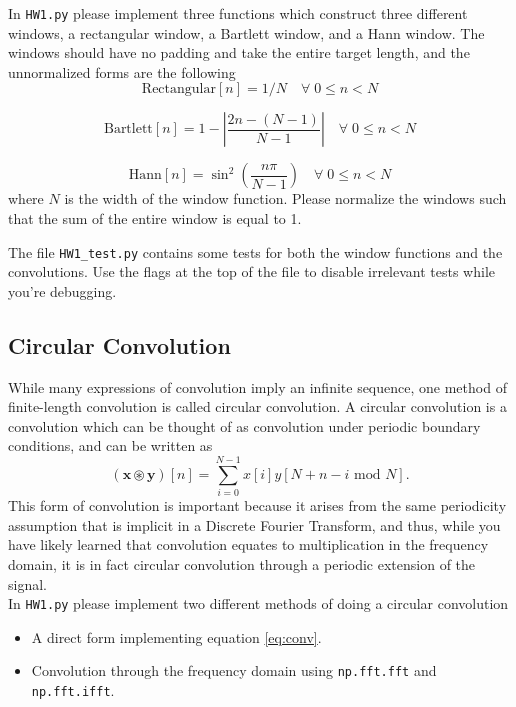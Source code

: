 \documentclass[12pt]{article}
\newcommand{\x}{\mathbf{x}}
\newcommand{\y}{\mathbf{y}}
\newcommand{\0}{\mathbf{0}}
\begin{document}
In \verb|HW1.py| please implement three functions which construct three different windows, a rectangular window, a Bartlett window, and a Hann window.
The windows should have no padding and take the entire target length, and the unnormalized forms are the following
\begin{equation}
\text{Rectangular}[n] = 1/N \quad \forall \; 0 \leq n < N
\end{equation}

\begin{equation}
\text{Bartlett}[n] = 1 - \left|\frac{2n - (N - 1)}{N-1}\right| \quad \forall \; 0 \leq n < N
\end{equation}

\begin{equation}
\text{Hann}[n] = \sin^2\left(\frac{n\pi}{N-1}\right) \quad \forall \; 0 \leq n < N
\end{equation}
where $N$ is the width of the window function.
Please normalize the windows such that the sum of the entire window is equal to 1.

The file \verb|HW1_test.py| contains some tests for both the window functions and the convolutions.
Use the flags at the top of the file to disable irrelevant tests while you're debugging.

\subsection{Circular Convolution}
While many expressions of convolution imply an infinite sequence, one method of finite-length convolution is called circular convolution.
A circular convolution is a convolution which can be thought of as convolution under periodic boundary conditions, and can be written as
\begin{equation}
(\x \circledast \y)[n] = \sum_{i=0}^{N-1} x[i] y[N + n-i \text{ mod } N]. \label{eq:conv}
\end{equation}
This form of convolution is important because it arises from the same periodicity assumption that is implicit in a Discrete Fourier Transform, and thus, while you have likely learned that convolution equates to multiplication in the frequency domain, it is in fact circular convolution through a periodic extension of the signal.\\
In \verb|HW1.py| please implement two different methods of doing a circular convolution
\begin{itemize}
\item A direct form implementing equation \ref{eq:conv}.
\item Convolution through the frequency domain using \verb|np.fft.fft| and \verb|np.fft.ifft|.
\end{itemize}
\end{document}
